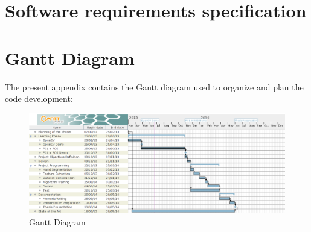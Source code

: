 \begin{appendices}
\chapter{Software requirements specification}
	


\chapter{Gantt Diagram}
The present appendix contains the Gantt diagram used to organize and plan the code development:
\begin{figure}[h]
	\centering
    \includegraphics[scale=0.5, angle=90]{img/gantt.eps}
	\caption[Gantt Diagram]{Gantt Diagram}	
\end{figure}

\end{appendices}